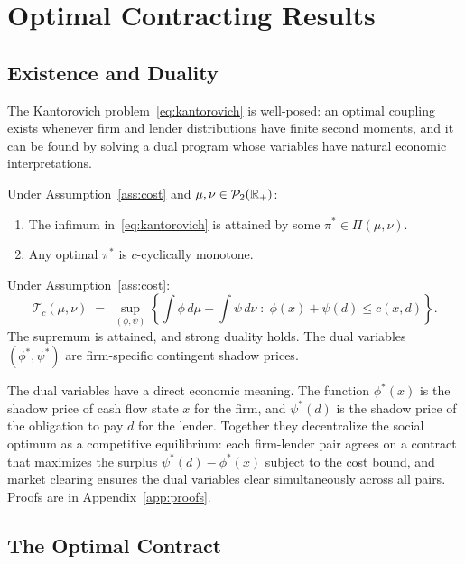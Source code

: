 \section{Optimal Contracting Results}
\label{sec:theoretical_results}

\subsection{Existence and Duality}

The Kantorovich problem~\eqref{eq:kantorovich} is well-posed: an optimal coupling exists whenever firm and lender distributions have finite second moments, and it can be found by solving a dual program whose variables have natural economic interpretations.

\begin{theorem}[Existence]
\label{thm:kantorovich_existence}
Under Assumption~\ref{ass:cost} and $\mu, \nu \in \mathcal{P}_2(\mathbb{R}_{+})$:
\begin{enumerate}[label=(\roman*)]
  \item The infimum in~\eqref{eq:kantorovich} is attained by some $\pi^* \in \Pi(\mu,\nu)$.
  \item Any optimal $\pi^*$ is $c$-cyclically monotone.
\end{enumerate}
\end{theorem}

\begin{theorem}
\label{thm:duality}
Under Assumption~\ref{ass:cost}:
\[
  \mathcal{T}_c(\mu,\nu) \;=\; \sup_{(\phi,\psi)} \left\{\int \phi\,d\mu + \int \psi\,d\nu \;:\; \phi(x)+\psi(d) \leq c(x,d)\right\}.
\]
The supremum is attained, and strong duality holds. The dual variables $(\phi^*, \psi^*)$ are firm-specific contingent shadow prices.
\end{theorem}

The dual variables have a direct economic meaning. The function $\phi^*(x)$ is the shadow price of cash flow state $x$ for the firm, and $\psi^*(d)$ is the shadow price of the obligation to pay $d$ for the lender. Together they decentralize the social optimum as a competitive equilibrium: each firm-lender pair agrees on a contract that maximizes the surplus $\psi^*(d) - \phi^*(x)$ subject to the cost bound, and market clearing ensures the dual variables clear simultaneously across all pairs. Proofs are in Appendix~\ref{app:proofs}.

\subsection{The Optimal Contract}

